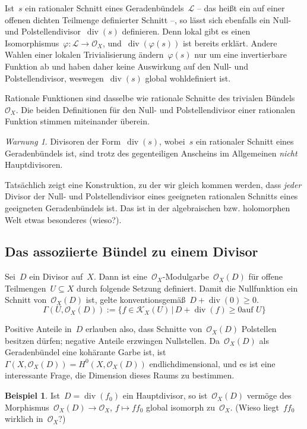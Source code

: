 \documentclass[a4paper,ngerman,12pt]{scrartcl}
\theoremstyle{definition}
\newtheorem{ex}[defn]{Beispiel}
\theoremstyle{plain}
\theoremstyle{remark}
\newtheorem{warning}[defn]{Warnung}
\newcommand{\K}{\mathcal{K}}
\renewcommand{\L}{\mathcal{L}}
\renewcommand{\O}{\mathcal{O}}
\renewcommand{\div}{\operatorname{div}}
\begin{document}
Ist~$s$ ein rationaler Schnitt eines Geradenbündels~$\L$ -- das heißt ein auf
einer offenen dichten Teilmenge definierter Schnitt --, so lässt sich ebenfalls
ein Null- und Polstellendivisor~$\div(s)$ definieren. Denn lokal gibt es einen
Isomorphismus~$\varphi : \L \to \O_X$, und~$\div(\varphi(s))$ ist bereits
erklärt. Andere Wahlen einer lokalen Trivialisierung ändern~$\varphi(s)$ nur um
eine invertierbare Funktion ab und haben daher keine Auswirkung auf den Null-
und Polstellendivisor, weswegen~$\div(s)$ global wohldefiniert ist.

Rationale Funktionen sind dasselbe wie rationale Schnitte des trivialen
Bündels~$\O_X$. Die beiden Definitionen für den Null- und
Polstellendivisor einer rationalen Funktion stimmen miteinander überein.

\begin{warning}Divisoren der Form~$\div(s)$, wobei~$s$ ein rationaler Schnitt
eines Geradenbündels ist, sind trotz des gegenteiligen Anscheins im
Allgemeinen \emph{nicht} Hauptdivisoren.\end{warning}

Tatsächlich zeigt eine Konstruktion, zu der wir gleich kommen werden, dass
\emph{jeder} Divisor der Null- und Polstellendivisor eines geeigneten rationalen Schnitts
eines geeigneten Geradenbündels ist. Das ist in der algebraischen bzw.
holomorphen Welt etwas besonderes (wieso?).


\subsection*{Das assoziierte Bündel zu einem Divisor}

\begin{defn}Sei~$D$ ein Divisor auf~$X$. Dann ist
eine~$\O_X$-Modulgarbe~$\O_X(D)$ für offene Teilmengen~$U \subseteq X$ durch
folgende Setzung definiert. Damit die Nullfunktion ein Schnitt von~$\O_X(D)$
ist, gelte konventionsgemäß~$D + \div(0) \geq 0$.
\[ \Gamma(U, \O_X(D)) := \{ f \in \K_X(U) \,|\, \text{$D + \div(f) \geq 0$
auf~$U$} \} \]
\end{defn}

Positive Anteile in~$D$ erlauben also, dass Schnitte von~$\O_X(D)$ Polstellen
besitzen dürfen; negative Anteile erzwingen Nullstellen. Da~$\O_X(D)$ als
Geradenbündel eine kohärante Garbe ist, ist~$\Gamma(X,\O_X(D)) =
H^0(X,\O_X(D))$ endlichdimensional, und es ist eine interessante Frage, die
Dimension dieses Raums zu bestimmen.

\begin{ex}\label{ex:o-hauptdivisor}
Ist~$D = \div(f_0)$ ein Hauptdivisor, so ist~$\O_X(D)$ vermöge des
Morphismus~$\O_X(D) \to \O_X$, $f \mapsto f f_0$ global isomorph zu~$\O_X$.
(Wieso liegt~$f f_0$ wirklich in~$\O_X$?)\end{ex}
\end{document}
